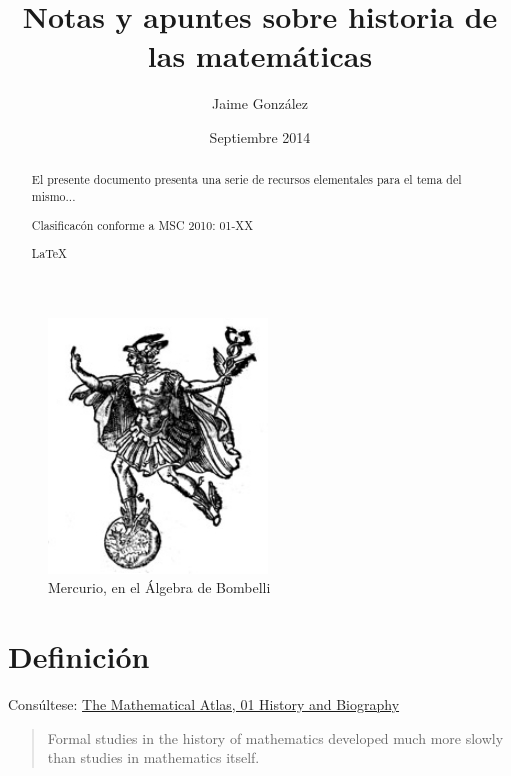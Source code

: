 \documentclass[12pt,letterpaper]{article}
\begin{document}
\title{Notas y apuntes sobre historia de las matem\'aticas}
\author{Jaime Gonz\'alez}
\date{Septiembre 2014}
\maketitle
\begin{abstract}
El presente documento presenta una serie de recursos elementales para el tema del mismo...

	\begin{center}
Clasificac\'on conforme a MSC 2010: 01-XX
	\end{center}

	\begin{center}
		{\LaTeX}
	\end{center}
\end{abstract}

\begin{figure}[h!]
	\centering
		\includegraphics[scale=0.30]{MercurioBombelli.jpg}
		\caption{Mercurio, en el \'Algebra de Bombelli}
	\label{threadsVsSync}
	\end{figure}

\newpage
\tableofcontents
\listoffigures

\newpage
\section{Definici\'on}
Cons\'ultese:
\href{http://www.math.niu.edu/~rusin/known-math/index/01-XX.html}{The Mathematical Atlas, 01 History and Biography}

	\begin{quotation}
Formal studies in the history of mathematics developed much more slowly than
studies in mathematics itself. 
	\end{quotation}
\end{document}
